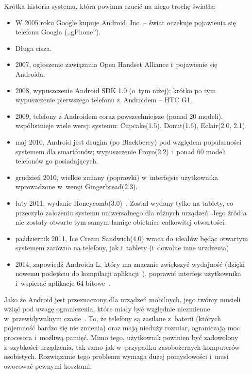 Krótka historia systemu, która powinna rzucić na niego trochę światła:
\begin{itemize}
	\item W 2005 roku Google kupuje Android, Inc. -- świat oczekuje pojawienia się telefonu Googla (,,gPhone'').
	\item Długa cisza.
	\item 2007, ogłoszenie zawiązania Open Handset Alliance i~pojawienie się Androida.
	\item 2008, wypuszczenie Android SDK 1.0 (o~tym niżej); krótko po tym wypuszczenie pierwszego telefonu z~Androidem -- HTC G1.
	\item 2009, telefony z Androidem coraz powszechniejsze (ponad 20 modeli), współistnieje wiele wersji systemu: Cupcake(1.5), Donut(1.6), Eclair(2.0, 2.1).
	\item maj 2010, Android jest drugim (po Blackberry) pod względem popularności systemem dla smartfonów; wypuszczenie Froyo(2.2) i~ponad 60 modeli telefonów go posiadających.
	\item grudzień 2010, wielkie zmiany (poprawki) w~interfejsie użytkownika wprowadzone w~wersji Gingerbread(2.3).
	\item luty 2011, wydanie Honeycomb(3.0)~\cite{android-history}. Został wydany tylko na tablety, co przeczyło założeniu systemu uniwersalnego dla różnych urządzeń. Jego źródła nie zostały otwarte tym samym łamiąc obietnice całkowitej otwartości.
	\item październik 2011, Ice Cream Sandwich(4.0) wraca do ideałów będąc otwartym systemem zarówno na telefony, jak i~tablety (i~dowolne inne urzdzenia)
	\item 2014, zapowiedź Androida L, który ma znacznie zwiększyć wydajność (dzięki nowemu podejściu do kompilacji aplikacji~\cite{android-art}), poprawić interfejs użytkownika i~wspierać aplikacje 64-bitowe~\cite{android-l-ogolnie}.
\end{itemize}

Jako że Android jest przeznaczony dla urządzeń mobilnych, jego twórcy musieli wziąć pod uwagę ograniczenia, które miały być względnie niezmienne w~przewidywalnym czasie~\cite{learning-android}.
To, że telefony są zasilane z~baterii (których pojemność bardzo się nie zmienia) oraz mają nieduży rozmiar, ograniczają moc procesora i~możliwą pamięć. Mimo tego, użytkownik powinien być zadowolony z~szybkości urządzenia, tak samo jak w~przypadku zasobożernych komputerów osobistych.
Rozwiązanie tego problemu wymaga dużej pomysłowości i~musi owocować pewnymi kosztami.


